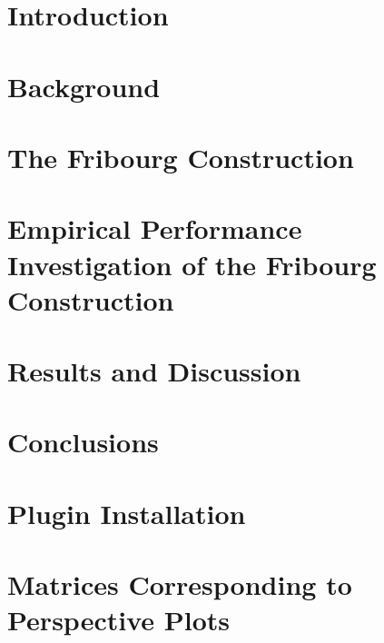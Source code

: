 \documentclass[a4paper]{report}
\begin{document}
\dominitoc
\tableofcontents

\chapter{Introduction}
\label{chap_intro}
\minitoc
\newpage


\chapter{Background}
\label{chap_background}
\minitoc
\newpage


\chapter{The Fribourg Construction}
\label{chap_construction}
\minitoc
\newpage


\chapter{Empirical Performance Investigation of the Fribourg Construction}
\label{chap_investigation}
\minitoc
\newpage


\chapter{Results and Discussion}
\label{chap_results}
\minitoc
\newpage


\chapter{Conclusions}
\label{chap_conclusions}



\appendix
\chapter{Plugin Installation}
\label{app_plugin}


\chapter{Matrices Corresponding to Perspective Plots}
\label{app_matrices}

\end{document}
